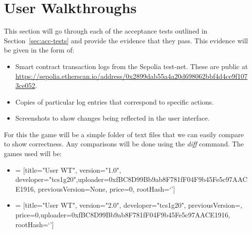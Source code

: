 
\chapter{User Walkthroughs}\label{app:user-walkthrough}

This section will go through each of the acceptance tests outlined in Section~\ref{sec:acc-tests} and provide the evidence that they pass. This evidence will be given in the form of:

\begin{itemize}
  \item Smart contract transaction logs from the Sepolia test-net. These are public at \small\url{https://sepolia.etherscan.io/address/0x2899dab55a4a20d698062bbf4d4ce9f1073ce052}\normalsize.
  \item Copies of particular log entries that correspond to specific actions.
  \item Screenshots to show changes being reflected in the user interface.
\end{itemize}

\newparagraph
For this the game will be a simple folder of text files that we can easily compare to show correctness. Any comparisons will be done using the \textit{diff} command. The games used will be:

\small
\begin{itemize}
  \item {} = [title="User WT", version="1.0", developer="tcs1g20",\newline uploader=0xfBC8D99Bb9ab8F781fF04F9b45Fe5c97AACE1916, previousVersion=None, price=0, rootHash=`']
  \item {} = [title="User WT", version="2.0", developer="tcs1g20", previousVersion=, price=0,\newline uploader=0xfBC8D99Bb9ab8F781fF04F9b45Fe5c97AACE1916, rootHash=`']
\end{itemize}
\normalsize





